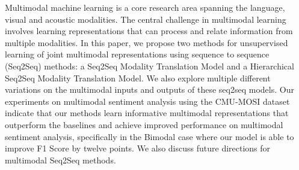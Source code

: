Multimodal machine learning is a core research area spanning the language, visual and acoustic modalities. The central challenge in multimodal learning involves learning representations that can process and relate information from multiple modalities. In this paper, we propose two methods for unsupervised learning of joint multimodal representations using sequence to sequence (Seq2Seq) methods: a Seq2Seq Modality Translation Model and a Hierarchical Seq2Seq Modality Translation Model. We also explore multiple different variations on the multimodal inputs and outputs of these seq2seq models. Our experiments on multimodal sentiment analysis using the CMU-MOSI dataset indicate that our methods learn informative multimodal representations that outperform the baselines and achieve improved performance on multimodal sentiment analysis, specifically in the Bimodal case where our model is able to improve F1 Score by twelve points. We also discuss future directions for multimodal Seq2Seq methods.
